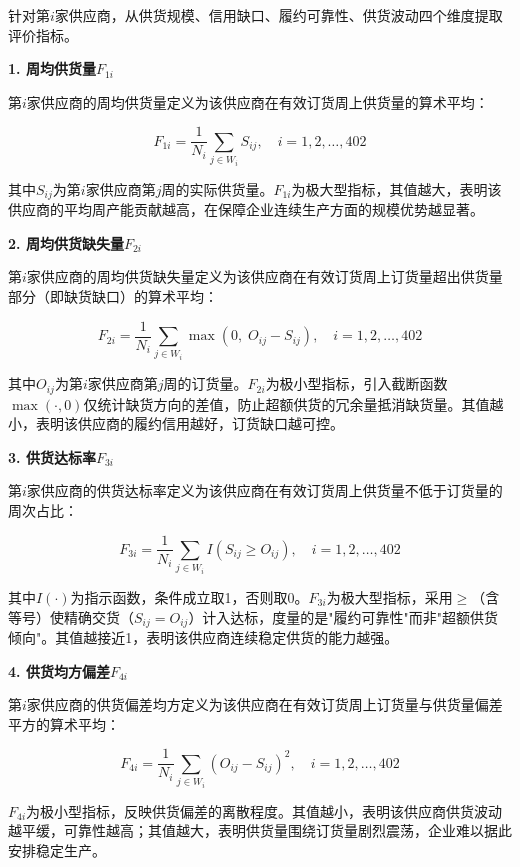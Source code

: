 \documentclass[12pt,a4paper]{ctexart}
\theoremstyle{definition}
\theoremstyle{plain}
\theoremstyle{remark}
\begin{document}
针对第$i$家供应商，从供货规模、信用缺口、履约可靠性、供货波动四个维度提取评价指标。

\textbf{1. 周均供货量$F_{1i}$}

第$i$家供应商的周均供货量定义为该供应商在有效订货周上供货量的算术平均：

\begin{equation}
F_{1i} = \frac{1}{N_i} \sum_{j \in W_i} S_{ij}, \quad i = 1, 2, \dots, 402
\end{equation}

其中$S_{ij}$为第$i$家供应商第$j$周的实际供货量。$F_{1i}$为极大型指标，其值越大，表明该供应商的平均周产能贡献越高，在保障企业连续生产方面的规模优势越显著。

\textbf{2. 周均供货缺失量$F_{2i}$}

第$i$家供应商的周均供货缺失量定义为该供应商在有效订货周上订货量超出供货量部分（即缺货缺口）的算术平均：

\begin{equation}
F_{2i} = \frac{1}{N_i} \sum_{j \in W_i} \max(0,\; O_{ij} - S_{ij}), \quad i = 1, 2, \dots, 402
\end{equation}

其中$O_{ij}$为第$i$家供应商第$j$周的订货量。$F_{2i}$为极小型指标，引入截断函数$\max(\cdot, 0)$仅统计缺货方向的差值，防止超额供货的冗余量抵消缺货量。其值越小，表明该供应商的履约信用越好，订货缺口越可控。

\textbf{3. 供货达标率$F_{3i}$}

第$i$家供应商的供货达标率定义为该供应商在有效订货周上供货量不低于订货量的周次占比：

\begin{equation}
F_{3i} = \frac{1}{N_i} \sum_{j \in W_i} I(S_{ij} \geq O_{ij}), \quad i = 1, 2, \dots, 402
\end{equation}

其中$I(\cdot)$为指示函数，条件成立取1，否则取0。$F_{3i}$为极大型指标，采用$\geq$（含等号）使精确交货（$S_{ij} = O_{ij}$）计入达标，度量的是"履约可靠性"而非"超额供货倾向"。其值越接近1，表明该供应商连续稳定供货的能力越强。

\textbf{4. 供货均方偏差$F_{4i}$}

第$i$家供应商的供货偏差均方定义为该供应商在有效订货周上订货量与供货量偏差平方的算术平均：

\begin{equation}
F_{4i} = \frac{1}{N_i} \sum_{j \in W_i} (O_{ij} - S_{ij})^2, \quad i = 1, 2, \dots, 402
\end{equation}

$F_{4i}$为极小型指标，反映供货偏差的离散程度。其值越小，表明该供应商供货波动越平缓，可靠性越高；其值越大，表明供货量围绕订货量剧烈震荡，企业难以据此安排稳定生产。
\end{document}
